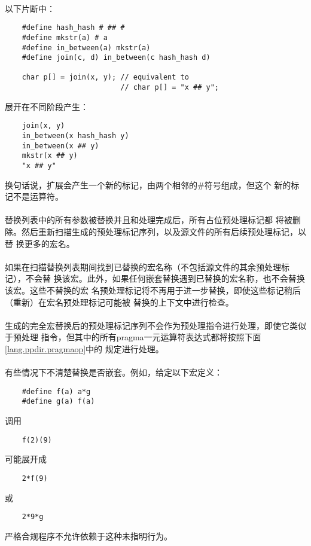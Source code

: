 {\paragraph{}
\ex* 以下片断中：
\begin{lstlisting}
    #define hash_hash # ## #
    #define mkstr(a) # a
    #define in_between(a) mkstr(a)
    #define join(c, d) in_between(c hash_hash d)

    char p[] = join(x, y); // equivalent to
                           // char p[] = "x ## y";
\end{lstlisting}
展开在不同阶段产生：
\begin{lstlisting}
    join(x, y)
    in_between(x hash_hash y)
    in_between(x ## y)
    mkstr(x ## y)
    "x ## y"
\end{lstlisting}
换句话说，扩展会产生一个新的标记，由两个相邻的\#符号组成，但这个
新的标记不是运算符。

\paragraph{}
替换列表中的所有参数被替换并且\tm{\#}和\tm{\#\#}处理完成后，所有占位预处理标记都
将被删除。然后重新扫描生成的预处理标记序列，以及源文件的所有后续预处理标记，以替
换更多的宏名。

\paragraph{}
如果在扫描替换列表期间找到已替换的宏名称（不包括源文件的其余预处理标记），不会替
换该宏。此外，如果任何嵌套替换遇到已替换的宏名称，也不会替换该宏。这些不替换的宏
名预处理标记将不再用于进一步替换，即使这些标记稍后（重新）在宏名预处理标记可能被
替换的上下文中进行检查。

\paragraph{}
生成的完全宏替换后的预处理标记序列不会作为预处理指令进行处理，即使它类似于预处理
指令，但其中的所有pragma一元运算符表达式都将按照下面\ref{lang.ppdir.pragmaop}中的
规定进行处理。

\paragraph{}
\ex* 有些情况下不清楚替换是否嵌套。例如，给定以下宏定义：
\begin{lstlisting}
    #define f(a) a*g
    #define g(a) f(a)
\end{lstlisting}
调用
\begin{lstlisting}
    f(2)(9)
\end{lstlisting}
可能展开成
\begin{lstlisting}
    2*f(9)
\end{lstlisting}
或
\begin{lstlisting}
    2*9*g
\end{lstlisting}
严格合规程序不允许依赖于这种未指明行为。

}
